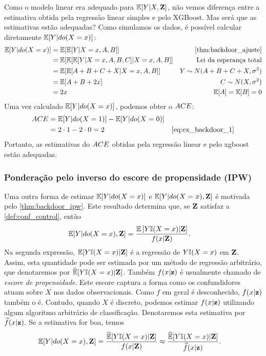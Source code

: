 \begin{example}
 Como o modelo linear era adequado para ${\mathbb E}[Y|X,{\mathbf{Z}}]$,
 não vemos diferença entre a estimativa obtida
 pela regressão linear simples e pelo XGBoost.
 Mas será que as estimativas estão adequadas?
 Como simulamos os dados,
 é possível calcular diretamente ${\mathbb E}[Y|do(X=x)]$:
 \begin{align}
  \label{eq:ex_backdoor_1}
  \E[Y|do(X=x)]
  &= \E[\E[Y|X=x, A, B]]
  & \text{\cref{thm:backdoor_ajuste}} \nonumber \\
  &= \E[\E[\E[Y|X=x, A, B, C]|X=x, A, B]]
  & \text{Lei da esperança total} \nonumber \\
  &= \E[\E[A+B+C+X|X=x, A, B]]
  & Y \sim N(A+B+C+X, \sigma^2) \nonumber \\
  &= \E[A + B + 2x]
  & C \sim N(X, \sigma^2) \nonumber \\
  &= 2x
  & \E[A] = \E[B] = 0
 \end{align}
 Uma vez calculado ${\mathbb E}[Y|do(X=x)]$,
 podemos obter o ${ACE}$:
 \begin{align*}
  \ACE
  &= \E[Y|do(X=1)] - \E[Y|do(X=0)] \\
  &= 2 \cdot 1 - 2 \cdot 0 = 2
  & \text{\cref{eq:ex_backdoor_1}}
 \end{align*}
 Portanto, as estimativas do ${ACE}$ obtidas 
 pela regressão linear e pelo xgboost 
 estão adequadas.
\end{example}

\subsubsection{Ponderação pelo inverso do escore de propensidade (IPW)}

Uma outra forma de estimar 
${\mathbb E}[Y|do(X=x)]$ e ${\mathbb E}[Y|do(X=x),{\mathbf{Z}}]$ é
motivada pelo \cref{thm:backdoor_ipw}.
Este resultado determina que, 
se ${\mathbf{Z}}$ satisfaz a \cref{def:conf_control}, então
\begin{align*}
 {\mathbb E}[Y|do(X=x),{\mathbf{Z}}] 
 &= \frac{{\mathbb E}\left[Y {\mathbb I}(X=x)|{\mathbf{Z}}\right]}{f(x|{\mathbf{Z}})}.
\end{align*}
Na segunda expressão, ${\mathbb E}[Y {\mathbb I}(X=x)|{\mathbf{Z}}]$ é 
a regressão de $Y{\mathbb I}(X=x)$ em ${\mathbf{Z}}$.
Assim, esta quantidade pode ser estimada por
um método de regressão arbitrário, que
denotaremos por $\widehat{{\mathbb E}}[Y {\mathbb I}(X=x)|{\mathbf{Z}}]$.
Também $f(x|{\mathbf{z}})$ é 
usualmente chamado de \textit{escore de propensidade}.
Este escore captura a forma como 
os confundidores atuam sobre $X$
nos dados observacionais.
Como $f$ em geral é desconhecido,
$f(x|{\mathbf{z}})$ também o é.
Contudo, quando $X$ é discreto,
podemos estimar $f(x|{\mathbf{z}})$ utilizando
algum algoritmo arbitrário de classificação.
Denotaremos esta estimativa por $\widehat{f}(x|{\mathbf{z}})$.
Se a estimativa for boa, temos
\begin{align*}
 {\mathbb E}[Y|do(X=x),{\mathbf{Z}}]
 &= \frac{\widehat{{\mathbb E}}[Y {\mathbb I}(X=x)|{\mathbf{Z}}]}{f(x|{\mathbf{Z}})}
 \approx \frac{\widehat{{\mathbb E}}[Y {\mathbb I}(X=x)|{\mathbf{Z}}]}{\widehat{f}(x|{\mathbf{z}})}.
\end{align*}


